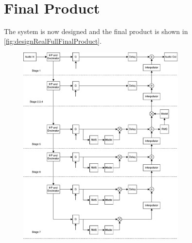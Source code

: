 \chapter{Final Product}

The system is now designed and the final product is shown in \autoref{fig:designRealFullFinalProduct}.



\begin{figure}[H]
\centering
\includegraphics[width=0.75\textwidth]{figures/designRealFullFinalProduct.pdf}
\caption{}
\label{fig:designRealFullFinalProduct}
\end{figure}





